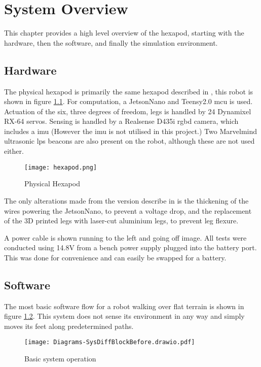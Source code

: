 \chapter{System Overview}
This chapter provides a high level overview of the hexapod, starting with the hardware, then the software, and finally the simulation
environment.
\section{Hardware}
The physical hexapod is primarily the same hexapod described in \cite{erasmus2023guidance}, this robot is shown in figure \ref{fig:hexapod}. For computation, a JetsonNano and Teensy2.0 \ac{mcu} is used. Actuation of the six, three degrees of freedom, legs is handled by 24 Dynamixel RX-64 servos. Sensing is handled by a Realsense D435i \ac{rgbd} camera, which includes a \ac{imu} (However the \ac{imu} is not utilised in this project.) Two Marvelmind ultrasonic \ac{lps} beacons are also present on the robot, although these are not used either.
\begin{figure}[h]
    \centering
    \texttt{[image: hexapod.png]}
    \caption{Physical Hexapod}
    \label{fig:hexapod}
\end{figure}

\noindent
The only alterations made from the version describe in \cite{erasmus2023guidance} is the thickening of the wires powering the JetsonNano,
to prevent a voltage drop, and the replacement of the 3D printed legs with laser-cut aluminium legs, to prevent leg flexure.

A power cable is shown running to the left and going off image. All tests were conducted using 14.8V
from a bench power supply plugged into the battery port. This was done for convenience and can easily be swapped for a battery.

\section{Software}
The most basic software flow for a robot walking over flat terrain is shown in figure \ref{fig:basic_sys}. This system does not sense
its environment in any way and simply moves its feet along predetermined paths.
\begin{figure}[h]
    \centering
    \texttt{[image: Diagrams-SysDiffBlockBefore.drawio.pdf]}
    \caption{Basic system operation}
    \label{fig:basic_sys}
\end{figure}

